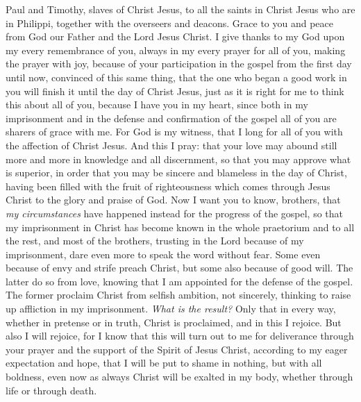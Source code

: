 
\begin{biblechapter} %
 Paul and Timothy, slaves of Christ Jesus, to all the saints in Christ Jesus who are in Philippi, together with the overseers and deacons.
\verse Grace to you and peace from God our Father and the Lord Jesus Christ.
 I give thanks to my God upon my every remembrance of you,
\verse always in my every prayer for all of you, making the prayer with joy,
\verse because of your participation in the gospel from the first day until now,
\verse convinced of this same thing, that the one who began a good work in you will finish it until the day of Christ Jesus,
\verse just as it is right for me to think this about all of you, because I have you in my heart, since both in my imprisonment and in the defense and confirmation of the gospel all of you are sharers of grace with me.
\verse For God is my witness, that I long for all of you with the affection of Christ Jesus.
 And this I pray: that your love may abound still more and more in knowledge and all discernment,
\verse so that you may approve what is superior, in order that you may be sincere and blameless in the day of Christ,
\verse having been filled with the fruit of righteousness which comes through Jesus Christ to the glory and praise of God.
 Now I want you to know, brothers, that \textit{my circumstances} have happened instead for the progress of the gospel,
\verse so that my imprisonment in Christ has become known in the whole praetorium and to all the rest,
\verse and most of the brothers, trusting in the Lord because of my imprisonment, dare even more to speak the word without fear.
\verse Some even because of envy and strife preach Christ, but some also because of good will.
\verse The latter do so from love, knowing that I am appointed for the defense of the gospel.
\verse The former proclaim Christ from selfish ambition, not sincerely, thinking to raise up affliction in my imprisonment.
\verse \textit{What is the result?} Only that in every way, whether in pretense or in truth, Christ is proclaimed, and in this I rejoice. But also I will rejoice,
\verse for I know that this will turn out to me for deliverance through your prayer and the support of the Spirit of Jesus Christ,
\verse according to my eager expectation and hope, that I will be put to shame in nothing, but with all boldness, even now as always Christ will be exalted in my body, whether through life or through death.

\end{biblechapter}

